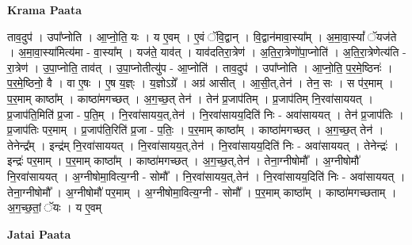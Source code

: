 \documentclass[17pt]{extarticle}
\begin{document}
\textbf{Krama Paata} \newline

ताव॒दुप॑ । उपा᳚प्नोति । आ॒प्नो॒ति॒ यः । य ए॒वम् । ए॒वं ॅवि॒द्वान् । वि॒द्वान॑मावा॒स्या᳚म् । अ॒मा॒वा॒स्यां᳚ ॅयज॑ते । अ॒मा॒वा॒स्या॑मित्य॑मा - वा॒स्या᳚म् । यज॑ते॒ याव॑त् । याव॑दतिरा॒त्रेण॑ । अ॒ति॒रा॒त्रेणो॑पा॒प्नोति॑ । अ॒ति॒रा॒त्रेणेत्य॑ति - रा॒त्रेण॑ । उ॒पा॒प्नोति॒ ताव॑त् । उ॒पा॒प्नोतीत्यु॑प - आ॒प्नोति॑ । ताव॒दुप॑ । उपा᳚प्नोति । आ॒प्नो॒ति॒ प॒र॒मे॒ष्ठिनः॑ । प॒र॒मे॒ष्ठिनो॒ वै । वा ए॒षः । ए॒ष य॒ज्ञ्ः । य॒ज्ञोऽग्रे᳚ । अग्र॑ आसीत् । आ॒सी॒त्,तेन॑ । तेन॒ सः । स प॑र॒माम् । प॒र॒माम् काष्ठा᳚म् । काष्ठा॑मगच्छत् । अ॒ग॒च्छ॒त् तेन॑ । तेन॑ प्र॒जाप॑तिम् । प्र॒जाप॑तिम् नि॒रवा॑साययत् । प्र॒जाप॑ति॒मिति॑ प्र॒जा - प॒ति॒म् । नि॒रवा॑सायय॒त्,तेन॑ । नि॒रवा॑सायय॒दिति॑ निः - अवा॑साययत् । तेन॑ प्र॒जाप॑तिः । प्र॒जाप॑तिः पर॒माम् । प्र॒जाप॑ति॒रिति॑ प्र॒जा - प॒तिः॒ । प॒र॒माम् काष्ठा᳚म् । काष्ठा॑मगच्छत् । अ॒ग॒च्छ॒त् तेन॑ । तेनेन्द्र᳚म् । इन्द्र॑म् नि॒रवा॑साययत् । नि॒रवा॑सायय॒त्,तेन॑ । नि॒रवा॑सायय॒दिति॑ निः - अवा॑साययत् । तेनेन्द्रः॑ । इन्द्रः॑ पर॒माम् । प॒र॒माम् काष्ठा᳚म् । काष्ठा॑मगच्छत् । अ॒ग॒च्छ॒त्,तेन॑ । तेना॒ग्नीषोमौ᳚ । अ॒ग्नीषोमौ॑ नि॒रवा॑साययत् । अ॒ग्नीषोमा॒वित्य॒ग्नी - सोमौ᳚ । नि॒रवा॑सायय॒त्,तेन॑ । नि॒रवा॑सायय॒दिति॑ निः - अवा॑साययत् । तेना॒ग्नीषोमौ᳚ । अ॒ग्नीषोमौ॑ पर॒माम् । अ॒ग्नीषोमा॒वित्य॒ग्नी - सोमौ᳚ । प॒र॒माम् काष्ठा᳚म् । काष्ठा॑मगच्छताम् । अ॒ग॒च्छ॒तां॒ ॅयः । य ए॒वम् \newline

\textbf{Jatai Paata} \newline
\end{document}
